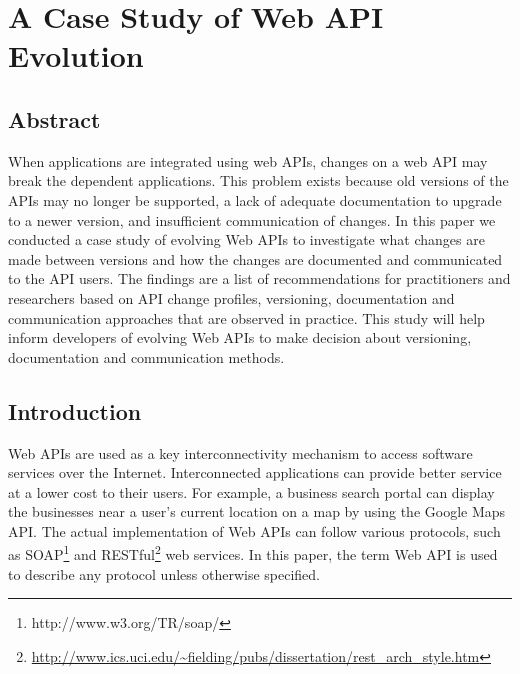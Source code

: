 \usetikzlibrary{backgrounds}
    \label{fig:screenshot_response}
\pgfplotsset{compat=1.5}


\chapter{A Case Study of Web API Evolution}





\section{Abstract}
When applications are integrated using web APIs, changes on a web API may break the dependent applications. This problem exists because old versions of the APIs may no longer be supported, a lack of adequate documentation to upgrade to a newer version, and insufficient communication of changes. In this paper we conducted a case study of evolving Web APIs to investigate what changes are made between versions and how the changes are documented and communicated to the API users. The findings are a list of recommendations for practitioners and researchers based on API change profiles, versioning, documentation and communication approaches that are observed in practice. This study will help inform developers of evolving Web APIs to make decision about versioning, documentation and communication methods.




\section{Introduction}

Web APIs are used as a key interconnectivity mechanism to access software services over the Internet. Interconnected applications can provide better service at a lower cost to their users. For example, a business search portal can display the businesses near a user's current location on a map by using the Google Maps API. The actual implementation of Web APIs can follow various protocols, such as SOAP\footnote{http://www.w3.org/TR/soap/} and RESTful\footnote{\url{http://www.ics.uci.edu/~fielding/pubs/dissertation/rest_arch_style.htm}} web services. In this paper, the term Web API is used to describe any protocol unless otherwise specified.

